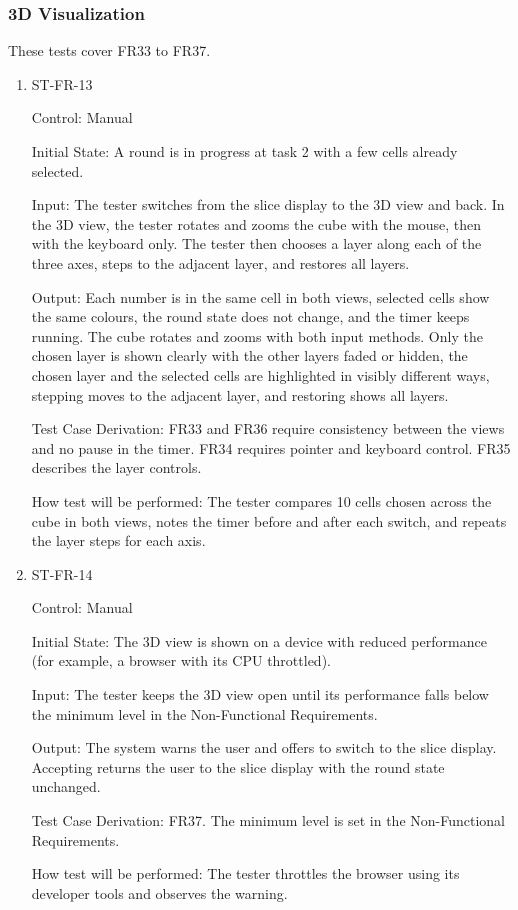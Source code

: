 \documentclass[12pt, titlepage]{article}
\begin{document}
\subsubsection{3D Visualization}

These tests cover FR33 to FR37.

\begin{enumerate}

\item{ST-FR-13\\}

Control: Manual

Initial State: A round is in progress at task 2 with a few cells already selected.

Input: The tester switches from the slice display to the 3D view and back. In the 3D view, the tester rotates and zooms the cube with the mouse, then with the keyboard only. The tester then chooses a layer along each of the three axes, steps to the adjacent layer, and restores all layers.

Output: Each number is in the same cell in both views, selected cells show the same colours, the round state does not change, and the timer keeps running. The cube rotates and zooms with both input methods. Only the chosen layer is shown clearly with the other layers faded or hidden, the chosen layer and the selected cells are highlighted in visibly different ways, stepping moves to the adjacent layer, and restoring shows all layers.

Test Case Derivation: FR33 and FR36 require consistency between the views and no pause in the timer. FR34 requires pointer and keyboard control. FR35 describes the layer controls.

How test will be performed: The tester compares 10 cells chosen across the cube in both views, notes the timer before and after each switch, and repeats the layer steps for each axis.

\item{ST-FR-14\\}

Control: Manual

Initial State: The 3D view is shown on a device with reduced performance (for example, a browser with its CPU throttled).

Input: The tester keeps the 3D view open until its performance falls below the minimum level in the Non-Functional Requirements.

Output: The system warns the user and offers to switch to the slice display. Accepting returns the user to the slice display with the round state unchanged.

Test Case Derivation: FR37. The minimum level is set in the Non-Functional Requirements.

How test will be performed: The tester throttles the browser using its developer tools and observes the warning.

\end{enumerate}
\end{document}
